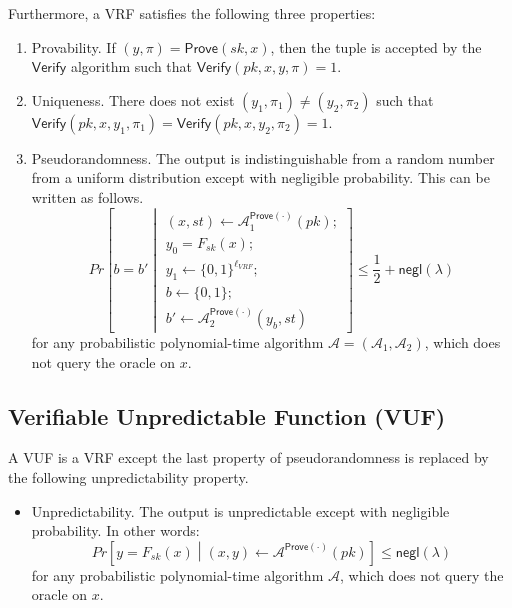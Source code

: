 \documentclass[letterpaper,twocolumn,10pt]{article}
\theoremstyle{definition}
\theoremstyle{remark}
\begin{document}
Furthermore, a VRF satisfies the following three properties:
\begin{enumerate}
\item Provability. If $(y, \pi) = \mathsf{Prove}(sk, x)$, then the tuple is accepted by the $\mathsf{Verify}$ algorithm such that $\mathsf{Verify}(pk, x, y, \pi) = 1$.
\item Uniqueness. There does not exist $(y_1, \pi_1) \neq (y_2, \pi_2)$ such that $\mathsf{Verify}(pk, x, y_1, \pi_1) = \mathsf{Verify}(pk, x, y_2, \pi_2) = 1$.
\item Pseudorandomness. The output is indistinguishable from a random number from a uniform distribution except with negligible probability. This can be written as follows.
\[
Pr\left[b = b' \middle\vert \begin{array}{l}
(x, st) \leftarrow \mathcal{A}^{\mathsf{Prove}(\cdot)}_{1}(pk);\\
y_0 = F_{sk}(x);\\
y_1 \leftarrow \{0, 1\}^{\ell_{VRF}};\\
b \leftarrow \{0, 1\};\\
b' \leftarrow \mathcal{A}^{\mathsf{Prove}(\cdot)}_{2}(y_b, st)
\end{array}\right] \leq \frac{1}{2} + \mathsf{negl}(\lambda)
\]
for any probabilistic polynomial-time algorithm $\mathcal{A} = (\mathcal{A}_1, \mathcal{A}_2)$, which does not query the oracle on $x$.
\end{enumerate}

\subsection{Verifiable Unpredictable Function (VUF)}
\label{appendix:vuf}
A VUF \cite{micali1999verifiable,dodis2005verifiable} is a VRF except the last property of pseudorandomness is replaced by the following unpredictability property.
\begin{itemize}
\item Unpredictability. The output is unpredictable except with negligible probability. In other words:
\[
Pr\left[y = F_{sk}(x) \middle\vert (x, y) \leftarrow \mathcal{A}^{\mathsf{Prove}(\cdot)}(pk)\right] \leq \mathsf{negl}(\lambda)
\]
for any probabilistic polynomial-time algorithm $\mathcal{A}$, which does not query the oracle on $x$.
\end{itemize}
\end{document}
